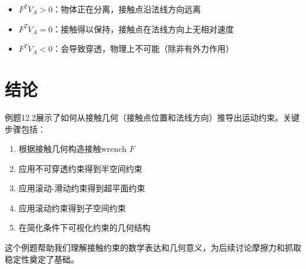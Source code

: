 \documentclass[12pt,a4paper]{article}
\begin{document}
\begin{itemize}
\item \textbf{$F^T V_A > 0$}：物体正在分离，接触点沿法线方向远离
\item \textbf{$F^T V_A = 0$}：接触得以保持，接触点在法线方向上无相对速度
\item \textbf{$F^T V_A < 0$}：会导致穿透，物理上不可能（除非有外力作用）
\end{itemize}

\section{结论}

例题12.2展示了如何从接触几何（接触点位置和法线方向）推导出运动约束。关键步骤包括：

\begin{enumerate}
\item 根据接触几何构造接触wrench $F$
\item 应用不可穿透约束得到半空间约束
\item 应用滚动-滑动约束得到超平面约束
\item 应用滚动约束得到子空间约束
\item 在简化条件下可视化约束的几何结构
\end{enumerate}

这个例题帮助我们理解接触约束的数学表达和几何意义，为后续讨论摩擦力和抓取稳定性奠定了基础。
\end{document}
